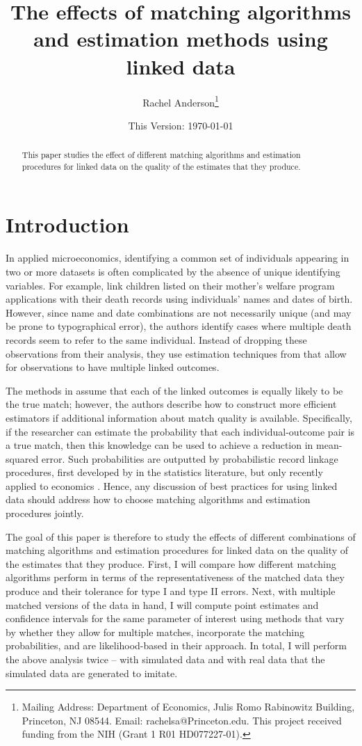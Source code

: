 \documentclass[12pt]{article}
\title{\singlespacing The effects of matching algorithms and estimation methods using linked data}
\author{Rachel Anderson\thanks{Mailing Address: Department of Economics, Julis Romo Rabinowitz Building,
Princeton, NJ 08544. Email: rachelsa@Princeton.edu.
This project received funding from the NIH (Grant 1 R01 HD077227-01). }}
\date{This Version: \today}
\begin{document}
\maketitle


\begin{abstract}
\singlespacing
\noindent This paper studies the effect of different matching algorithms and estimation procedures for linked data on the quality of the estimates that they produce.  \end{abstract}

\section{Introduction}
In applied microeconomics, identifying a common set of individuals appearing in two or more datasets is often complicated by the absence of unique identifying variables. For example,  \cite{aizer2016} link children listed on their mother's welfare program applications with their death records using individuals' names and dates of birth.  However, since name and date combinations are not necessarily unique (and may be prone to typographical error), the authors identify cases where multiple death records seem to refer to the same individual.  Instead of dropping these observations from their analysis, they use estimation techniques from \cite{ahl2019} that allow for observations to have multiple linked outcomes.  

The methods in \cite{ahl2019} assume that each of the linked outcomes is equally likely to be the true match; however, the authors describe how to construct more efficient estimators if additional information about match quality is available.  Specifically, if the researcher can estimate the probability that each individual-outcome pair is a true match, then this knowledge can be used to achieve a reduction in mean-squared error.  Such probabilities are outputted by probabilistic record linkage procedures, first developed by \cite{fellegi69} in the statistics literature, but only recently applied to economics \cite{arp2018}. Hence, any discussion of best practices for using linked data should address how to choose matching algorithms and estimation procedures jointly.  

The goal of this paper is therefore to study the effects of different combinations of matching algorithms and estimation procedures for linked data on the quality of the estimates that they produce.  First, I will compare how different matching algorithms perform in terms of the representativeness of the matched data they produce and their tolerance for type I and type II errors.  Next, with multiple matched versions of the data in hand, I will compute point estimates and confidence intervals for the same parameter of interest using methods that vary by whether they allow for multiple matches, incorporate the matching probabilities, and are likelihood-based in their approach.  In total, I will perform the above analysis twice -- with simulated data and with real data that the simulated data are generated to imitate.  
\end{document}
